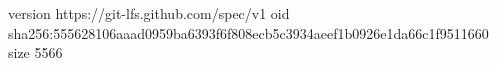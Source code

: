 version https://git-lfs.github.com/spec/v1
oid sha256:555628106aaad0959ba6393f6f808ecb5c3934aeef1b0926e1da66c1f9511660
size 5566
